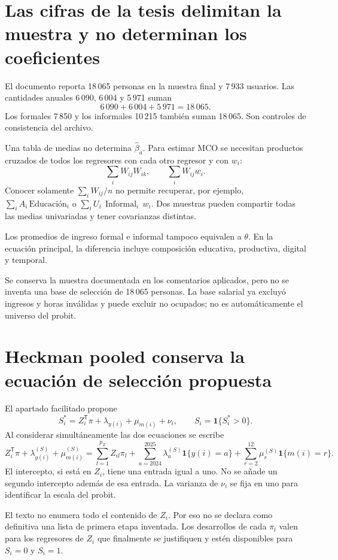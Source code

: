 \documentclass[11pt,a4paper]{article}
\begin{document}
\clearpage
\section{Las cifras de la tesis delimitan la muestra y no determinan los coeficientes}

El documento reporta 18\,065 personas en la muestra final y 7\,933 usuarios. Las cantidades anuales 6\,090, 6\,004 y 5\,971 suman
\[
6\,090+6\,004+5\,971=18\,065.
\]
Los formales 7\,850 y los informales 10\,215 también suman 18\,065. Son controles de consistencia del archivo.

Una tabla de medias no determina $\widehat\beta_a$. Para estimar MCO se necesitan productos cruzados de todos los regresores con cada otro regresor y con $w_i$:
\[
\sum_i W_{ij}W_{ik},\qquad \sum_iW_{ij}w_i.
\]
Conocer solamente $\sum_iW_{ij}/n$ no permite recuperar, por ejemplo,
$\sum_i A_i\,\text{Educación}_i$ o
$\sum_iU_i\,\operatorname{Informal}_i\,w_i$. Dos muestras pueden compartir todas las medias univariadas y tener covarianzas distintas.

Los promedios de ingreso formal e informal tampoco equivalen a $\theta$. En la ecuación principal, la diferencia incluye composición educativa, productiva, digital y temporal.

Se conserva la muestra documentada en los comentarios aplicados, pero no se inventa una base de selección de 18\,065 personas. La base salarial ya excluyó ingresos y horas inválidas y puede excluir no ocupados; no es automáticamente el universo del probit.

\clearpage
\section{Heckman pooled conserva la ecuación de selección propuesta}

El apartado facilitado propone
\[
S_i^*=Z_i^{\mathsf T}\pi+\lambda_{y(i)}+\mu_{m(i)}+\nu_i,
\qquad S_i=\mathbf1\{S_i^*>0\}. \tag{T11}
\]
Al considerar simultáneamente las dos ecuaciones se escribe
\[
Z_i^{\mathsf T}\pi+\lambda_{y(i)}^{(S)}+\mu_{m(i)}^{(S)}
=\sum_{l=1}^{p_Z}Z_{il}\pi_l
+\sum_{a=2024}^{2025}\lambda_a^{(S)}\mathbf1\{y(i)=a\}
+\sum_{r=2}^{12}\mu_r^{(S)}\mathbf1\{m(i)=r\}.
\]
El intercepto, si está en $Z_i$, tiene una entrada igual a uno. No se añade un segundo intercepto además de esa entrada. La varianza de $\nu_i$ se fija en uno para identificar la escala del probit.

El texto no enumera todo el contenido de $Z_i$. Por eso no se declara como definitiva una lista de primera etapa inventada. Los desarrollos de cada $\pi_l$ valen para los regresores de $Z_i$ que finalmente se justifiquen y estén disponibles para $S_i=0$ y $S_i=1$.
\end{document}
